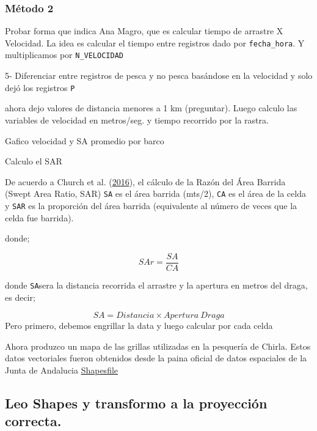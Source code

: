 \documentclass[
]{article}
\newenvironment{Shaded}{\begin{snugshade}}{\end{snugshade}}
\newcommand{\CommentTok}[1]{\textcolor[rgb]{0.56,0.35,0.01}{\textit{#1}}}
\newcommand{\ConstantTok}[1]{\textcolor[rgb]{0.56,0.35,0.01}{#1}}
\newcommand{\DecValTok}[1]{\textcolor[rgb]{0.00,0.00,0.81}{#1}}
\newcommand{\FunctionTok}[1]{\textcolor[rgb]{0.13,0.29,0.53}{\textbf{#1}}}
\newcommand{\NormalTok}[1]{#1}
\newcommand{\OtherTok}[1]{\textcolor[rgb]{0.56,0.35,0.01}{#1}}
\newcommand{\SpecialCharTok}[1]{\textcolor[rgb]{0.81,0.36,0.00}{\textbf{#1}}}
\begin{document}
\begin{Shaded}
\end{Shaded}

\hypertarget{muxe9todo-2}{%
\subsubsection{Método 2}\label{muxe9todo-2}}

Probar forma que indica Ana Magro, que es calcular tiempo de arrastre X Velocidad. La idea es calcular el tiempo entre registros dado por \texttt{fecha\_hora}. Y multiplicamos por \texttt{N\_VELOCIDAD}

5- Diferenciar entre registros de pesca y no pesca basándose en la velocidad y solo dejó los registros \texttt{P}

ahora dejo valores de distancia menores a 1 km (preguntar). Luego calculo las variables de velocidad en metros/seg. y tiempo recorrido por la rastra.

Gafico velocidad y SA promedio por barco

Calculo el SAR

De acuerdo a Church et al. (\protect\hyperlink{ref-Church2016}{2016}), el cálculo de la Razón del Área Barrida (Swept Area Ratio, SAR) \texttt{SA} es el área barrida (mts/2), \texttt{CA} es el área de la celda y \texttt{SAR} es la proporción del área barrida (equivalente al número de veces que la celda fue barrida).

donde;

\[
SAr = \frac{SA}{CA}
\]

donde \texttt{SA}sera la distancia recorrida el arrastre y la apertura en metros del draga, es decir;

\[
SA = Distancia \times Apertura \ Draga
\]
Pero primero, debemos engrillar la data y luego calcular por cada celda

Ahora produzco un mapa de las grillas utilizadas en la pesquería de Chirla. Estos datos vectoriales fueron obtenidos desde la paina oficial de datos espaciales de la Junta de Andalucia \href{https://portalrediam.cica.es/descargas?path=\%2F08_AMBITOS_INTERES_AMBIENTAL\%2F02_LITORAL_MARINO\%2F04_SOCIOECONOMIA\%2FZonasProduccionMoluscos}{Shapesfile}

\hypertarget{leo-shapes-y-transformo-a-la-proyecciuxf3n-correcta.}{%
\subsection{Leo Shapes y transformo a la proyección correcta.}\label{leo-shapes-y-transformo-a-la-proyecciuxf3n-correcta.}}
\end{document}
